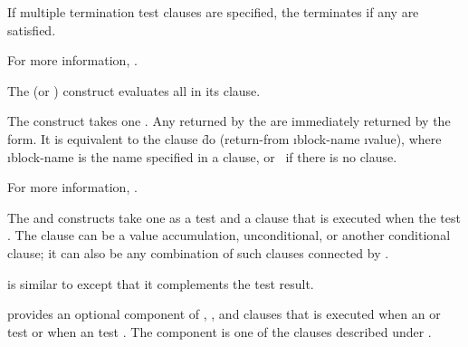 If multiple termination test clauses are specified, 
the   terminates if any are satisfied.

 
For more information, \seesection\LOOPTermTest.

\endsubsubsubsection%

 
The  (or ) construct evaluates all  in its clause.
 
The  construct takes one 
  . Any  returned by the  are
  immediately returned by the  form.
   It is equivalent to the clause
   \f{do (return-from \i{block-name} \i{value})},
   where \i{block-name} is the name specified in a 
   clause, or \nil\ if there is no  clause.

For more information, \seesection\LOOPUnconditional.

\endsubsubsubsection%


The  and  constructs take one  as a test 
and a clause that is executed when the test  .
The clause can be a value accumulation, unconditional, or 
another conditional clause; it can also be any combination
of such clauses connected by .
 
 is similar to 
except that it complements the test result.

 provides an optional component of ,
, and  clauses that is executed 
     when an  or  test  
  or when an  test  .
The component is one of the clauses described under .

